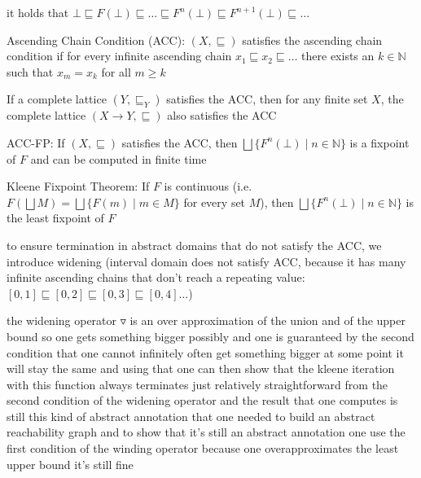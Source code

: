 \documentclass[a4paper]{article}
\begin{document}
\begin{minipage}[t]{0.16\linewidth}
\begin{betterlist}
{{\begin{betterlist}
\begin{betterlist}
						\begin{betterlist}
							\item it holds that $\bot\sqsubseteq F(\bot) \sqsubseteq \ldots \sqsubseteq F^n(\bot) \sqsubseteq F^{n+1}(\bot) \sqsubseteq \ldots$
							\item \alert{Ascending Chain Condition (ACC)}: $(X, \sqsubseteq)$ satisfies the \alert{ascending chain condition} if for every infinite ascending chain $x_1 \sqsubseteq x_2 \sqsubseteq \ldots$ there exists an $k \in \mathbb{N}$ such that $x_m = x_k$ for all $m \ge k$
							\begin{betterlist}
								\item If a complete lattice $(Y , \sqsubseteq_Y)$ satisfies the ACC, then for any finite set $X$, the complete lattice $(X \rightarrow Y , \sqsubseteq)$ also satisfies the ACC
							\end{betterlist}
							\item \alert{ACC-FP}: If $(X, \sqsubseteq)$ satisfies the ACC, then $\bigsqcup\{F^n(\bot) \mid n \in  \mathbb{N}\}$ is a fixpoint of $F$ and can be computed in finite time
							\item \alert{Kleene Fixpoint Theorem}: If $F$ is continuous (i.e. $F(\bigsqcup M) = \bigsqcup \{F(m) \mid m \in M\}$ for every set $M$), then $\bigsqcup\{F^n(\bot) \mid n \in \mathbb{N}\}$ is the least fixpoint of $F$
						\end{betterlist}
					\end{betterlist}
					\item to ensure termination in abstract domains that do not satisfy the ACC, we introduce widening (interval domain does not satisfy ACC, because it has many infinite ascending chains that don't reach a repeating value: $[0, 1] \sqsubseteq [0, 2]\sqsubseteq [0, 3]\sqsubseteq [0, 4]\ldots$)
					\begin{betterlist}
					  \item the widening operator $\triangledown$ is an over approximation of the union and of the upper bound so one gets something bigger possibly and one is guaranteed by the second condition that one cannot infinitely often get something bigger at some point it will stay the same and using that one can then show that the kleene iteration with this function always terminates just relatively straightforward from the second condition of the widening operator and the result that one computes is still this kind of abstract annotation that one needed to build an abstract reachability graph and to show that it's still an abstract annotation one use the first condition of the winding operator because one overapproximates the least upper bound it's still fine

\end{betterlist}
\end{betterlist}}}
\end{betterlist}
\end{minipage}
\end{document}
